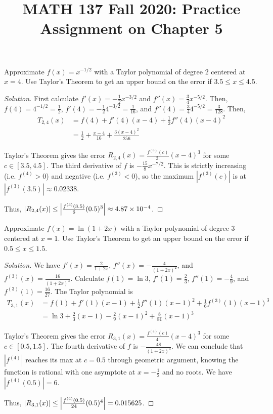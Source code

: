 
\title{MATH 137 Fall 2020: Practice Assignment on Chapter 5}


\thispagestyle{firstpage}
\textbf{\@title}

\question Approximate $f(x)=x^{-1/2}$ with a Taylor polynomial of degree 2 centered at $x=4$.
Use Taylor's Theorem to get an upper bound on the error if $3.5 \leq x \leq 4.5$.
\begin{proof}[Solution]
  First calculate $f'(x) = -\frac12 x^{-3/2}$ and $f''(x) = \frac34 x^{-5/2}$.
  Then, $f(4) = 4^{-1/2} = \frac12$, $f'(4) = -\frac12 4^{-3/2} = \frac{1}{16}$,
  and $f''(4) = \frac34 4^{-5/2} = \frac{3}{128}$. Then,
  \begin{align*}
    T_{2,4}(x) & = f(4) + f'(4)(x-4) + \frac12 f''(4)(x-4)^2       \\
               & = \frac12 + \frac{x-4}{16} + \frac{3(x-4)^2}{256}
  \end{align*}

  Taylor's Theorem gives the error $R_{2,4}(x)=\frac{f^{(3)}(c)}{3!}(x-4)^3$ for some $c\in[3.5,4.5]$.
  The third derivative of $f$ is $-\frac{15}{8} x^{-7/2}$.
  This is strictly increasing (i.e. $f^{(4)} > 0$) and negative (i.e. $f^{(3)} < 0$),
  so the maximum $|f^{(3)}(c)|$ is at $|f^{(3)}(3.5)| \approx 0.02338$.

  Thus, $|R_{2,4}(x)| \leq \abs{\frac{f^{(3)}(3.5)}{6}(0.5)^3} \approx 4.87 \times 10^{-4}$.
\end{proof}


\question Approximate $f(x)=\ln(1+2x)$ with a Taylor polynomial of degree 3 centered at $x=1$.
Use Taylor's Theorem to get an upper bound on the error if $0.5 \leq x \leq 1.5$.
\begin{proof}[Solution]
  We have $f'(x)=\frac{2}{1+2x}$, $f''(x)=-\frac{4}{(1+2x)^2}$, and $f^{(3)}(x)=\frac{16}{(1+2x)^3}$.
  Calculate $f(1)=\ln 3$, $f'(1)=\frac{2}{3}$, $f''(1)=-\frac{4}{9}$, and $f^{(3)}(1)=\frac{16}{27}$.
  The Taylor polynomial is
  \begin{align*}
    T_{3,1}(x) & = f(1) + f'(1)(x-1) + \frac12 f''(1)(x-1)^2 + \frac16 f^{(3)}(1)(x-1)^3 \\
               & = \ln 3 + \frac{2}{3}(x-1) - \frac{2}{9}(x-1)^2 + \frac{8}{81}(x-1)^3
  \end{align*}

  Taylor's Theorem gives the error $R_{3,1}(x)=\frac{f^{(4)}(c)}{4!}(x-4)^3$ for some $c\in[0.5,1.5]$.
  The fourth derivative of $f$ is $-\frac{48}{(1+2x)^4}$.
  We can conclude that $|f^{(4)}|$ reaches its max at $c=0.5$ through geometric argument,
  knowing the function is rational with one asymptote at $x=-\frac12$ and no roots.
  We have $|f^{(4)}(0.5)| = 6$.

  Thus, $|R_{3,1}(x)| \leq \abs{\frac{f^{(4)}(0.5)}{24}(0.5)^4} = 0.015625$.
\end{proof}


